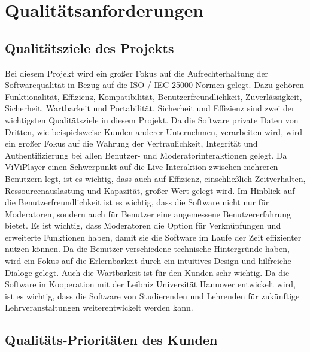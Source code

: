 \section{Qualitätsanforderungen}

	\subsection{Qualitätsziele des Projekts}
	
	Bei diesem Projekt wird ein großer Fokus auf die Aufrechterhaltung der Softwarequalität in Bezug auf die ISO / IEC 25000-Normen gelegt. Dazu gehören Funktionalität, Effizienz, Kompatibilität, Benutzerfreundlichkeit, Zuverlässigkeit, Sicherheit, Wartbarkeit und Portabilität.
    \linebreak
    Sicherheit und Effizienz sind zwei der wichtigsten Qualitätsziele in diesem Projekt. Da die Software private Daten von Dritten, wie beispielsweise Kunden anderer Unternehmen, verarbeiten wird, wird ein großer Fokus auf die Wahrung der Vertraulichkeit, Integrität und Authentifizierung bei allen Benutzer- und Moderatorinteraktionen gelegt.
    \linebreak
    Da ViViPlayer einen Schwerpunkt auf die Live-Interaktion zwischen mehreren Benutzern legt, ist es wichtig, dass auch auf Effizienz, einschließlich Zeitverhalten, Ressourcenauslastung und Kapazität, großer Wert gelegt wird.
    \linebreak
    Im Hinblick auf die Benutzerfreundlichkeit ist es wichtig, dass die Software nicht nur für Moderatoren, sondern auch für Benutzer eine angemessene Benutzererfahrung bietet. Es ist wichtig, dass Moderatoren die Option für Verknüpfungen und erweiterte Funktionen haben, damit sie die Software im Laufe der Zeit effizienter nutzen können. Da die Benutzer verschiedene technische Hintergründe haben, wird ein Fokus auf die Erlernbarkeit durch ein intuitives Design und hilfreiche Dialoge gelegt.
    \linebreak
    Auch die Wartbarkeit ist für den Kunden sehr wichtig. Da die Software in Kooperation mit der Leibniz Universität Hannover entwickelt wird, ist es wichtig, dass die Software von Studierenden und Lehrenden für zukünftige Lehrveranstaltungen weiterentwickelt werden kann.
	
	\subsection{Qualitäts-Prioritäten des Kunden}
		
